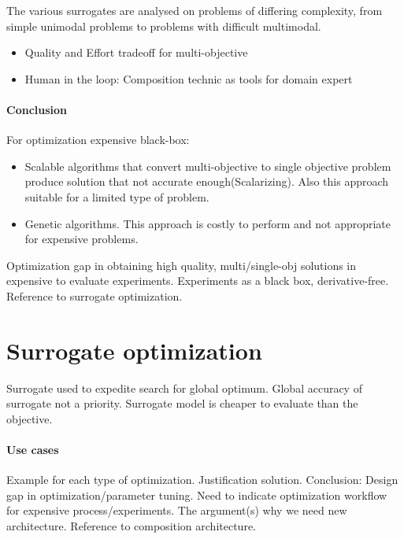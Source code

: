         The various surrogates are analysed on problems of differing complexity, from simple unimodal problems to problems with difficult multimodal. 

        \begin{itemize}
            \item Quality and Effort tradeoff for multi-objective
            \item Human in the loop: Composition technic as tools for domain expert
        \end{itemize}

        \paragraph{Conclusion}
        For optimization expensive black-box:
        \begin{itemize}
            \item Scalable algorithms that convert multi-objective to single objective problem produce solution that not accurate enough(Scalarizing). Also this approach suitable for a limited type of problem.
            \item Genetic algorithms. This approach is costly to perform and not appropriate for expensive problems.
        \end{itemize}
        Optimization gap in obtaining high quality, multi/single-obj solutions in expensive to evaluate experiments.
        Experiments as a black box, derivative-free. Reference to surrogate optimization.

    \section{Surrogate optimization}
        Surrogate used to expedite search for global optimum. Global accuracy of surrogate
        not a priority. Surrogate model is cheaper to evaluate than the objective.

        \cite{EngSurMod}

        \paragraph{Use cases}
        Example for each type of optimization. Justification solution.
        Conclusion: Design gap in optimization/parameter tuning. 
        Need to indicate optimization workflow for expensive process/experiments. 
        The argument(s) why we need new architecture. Reference to composition architecture.

